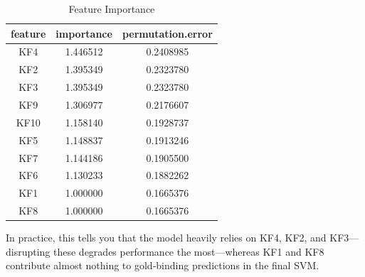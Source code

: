 \documentclass{article}
\begin{document}
\begin{table}[h!]
\centering
\label{tab:feature_importance}
\begin{tabular}{|c|c|c|}
\hline
\textbf{feature} & \textbf{importance} & \textbf{permutation.error} \\
\hline
KF4 & 1.446512 & 0.2408985 \\
KF2 & 1.395349 & 0.2323780 \\
KF3 & 1.395349 & 0.2323780 \\
KF9 & 1.306977 & 0.2176607 \\
KF10 & 1.158140 & 0.1928737 \\
KF5 & 1.148837 & 0.1913246 \\
KF7 & 1.144186 & 0.1905500 \\
KF6 & 1.130233 & 0.1882262 \\
KF1 & 1.000000 & 0.1665376 \\
KF8 & 1.000000 & 0.1665376 \\
\hline
\end{tabular}
\caption{Feature Importance}
\end{table}

In practice, this tells you that the model heavily relies on KF4, KF2, and KF3—disrupting these degrades performance the most—whereas KF1 and KF8 contribute almost nothing to gold‐binding predictions in the final SVM.
\end{document}
